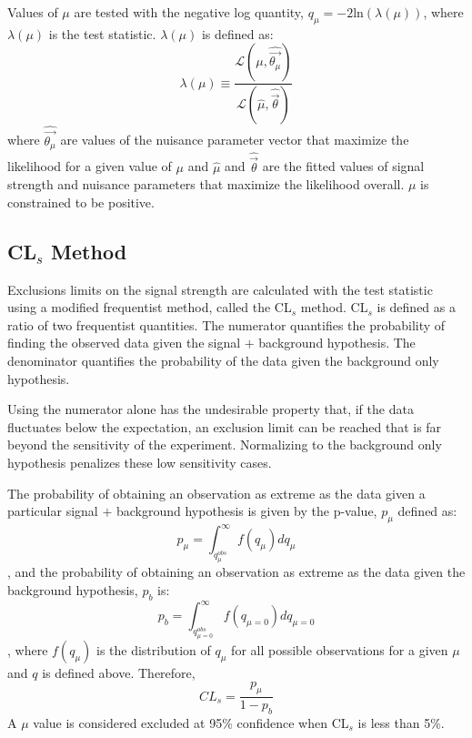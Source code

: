 Values of $\mu$ are tested with the negative log quantity, $q_{\mu}= -2$ln$(\lambda(\mu))$, where $\lambda(\mu)$ is the test statistic.
$\lambda(\mu)$ is defined as:
\begin{equation}
\lambda(\mu) \equiv \frac{\mathcal{L}(\mu,\hat{\vec{\theta_{\mu}}})}{\mathcal{L}(\hat{\mu},\hat{\vec{\theta}})}
\end{equation}
where $\hat{\vec{\theta_{\mu}}}$ are values of the nuisance parameter vector that maximize the likelihood for a given value of $\mu$ and $\hat{\mu}$ and $\hat{\vec{\theta}}$ are the fitted values of signal strength and nuisance parameters that maximize the likelihood overall. $\mu$ is constrained to be positive.  

\subsection{ CL$_{s}$ Method}

Exclusions limits on the signal strength are calculated with the test statistic using a modified frequentist method, called the CL$_{s}$ method\cite{0954-3899-28-10-313}. CL$_{s}$ is defined as a ratio of two frequentist quantities. The numerator quantifies the probability of finding the observed data given the signal $+$ background hypothesis. The denominator quantifies the probability of the data given the background only hypothesis.

Using the numerator alone has the undesirable property that, if the data fluctuates below the expectation, an exclusion limit can be reached that is far beyond the sensitivity of the experiment. Normalizing to the background only hypothesis penalizes these low sensitivity cases.

The probability of obtaining an observation as extreme as the data given a particular signal $+$ background hypothesis is given by the p-value, $p_{\mu}$ defined as:
\begin{equation}
 p_{\mu} = \int_{q_{\mu}^{obs}}^{\infty} f(q_{\mu}) dq_{\mu}
\end{equation}
, and the probability of obtaining an observation as extreme as the data given the background hypothesis, $p_b$ is:
\begin{equation}
 p_{b} = \int_{q_{\mu=0}^{obs}}^{\infty} f(q_{\mu=0}) dq_{\mu=0}
\end{equation}
, where $f(q_{\mu})$ is the distribution of $q_{\mu}$ for all possible observations for a given $\mu$ and $q$ is defined above. Therefore,
\begin{equation}
 CL_{s} = \frac{p_{\mu}}{1-p_b}
\end{equation}
A $\mu$ value is considered excluded at 95\% confidence when CL$_{s}$ is less than 5\%. 

